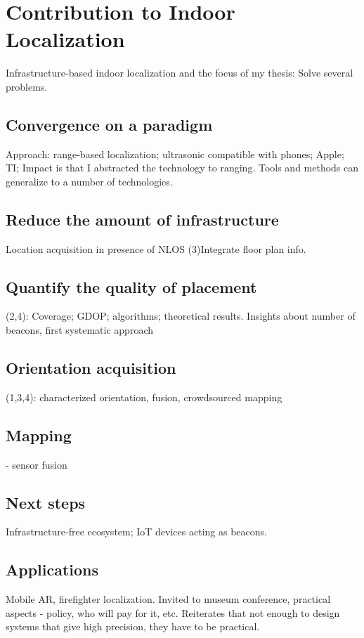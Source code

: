 \documentclass[10pt]{article}
\begin{document}
\section{Contribution to Indoor Localization}
Infrastructure-based indoor localization and the focus of my thesis:
Solve several problems.

\subsection{ Convergence on a paradigm }
Approach: range-based localization; ultrasonic compatible with phones; Apple; TI; 
Impact is that I abstracted the technology to ranging. Tools and methods can generalize to a number of technologies.

\subsection{Reduce the amount of infrastructure}
Location acquisition in presence of NLOS
(3)Integrate floor plan info.

\subsection{Quantify the quality of placement}
(2,4): Coverage; GDOP; algorithms; theoretical results.
Insights about number of beacons, first systematic approach

\subsection{Orientation acquisition}
(1,3,4): characterized orientation, fusion, crowdsourced mapping

\subsection{Mapping}
 - sensor fusion

\subsection{Next steps}
Infrastructure-free ecosystem; IoT devices acting as beacons.


\subsection{Applications} 
Mobile AR, firefighter localization. Invited to museum conference, practical aspects - policy, who will pay for it, etc. 
Reiterates that not enough to design systems that give high precision, they have to be practical. 
\end{document}
